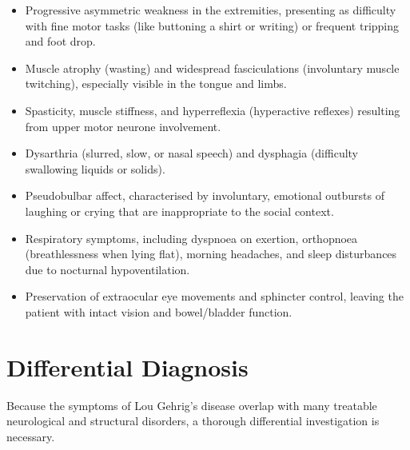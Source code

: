 \begin{itemize}
    \item Progressive asymmetric weakness in the extremities, presenting as difficulty with fine motor tasks (like buttoning a shirt or writing) or frequent tripping and foot drop.
    \item Muscle atrophy (wasting) and widespread fasciculations (involuntary muscle twitching), especially visible in the tongue and limbs.
    \item Spasticity, muscle stiffness, and hyperreflexia (hyperactive reflexes) resulting from upper motor neurone involvement.
    \item Dysarthria (slurred, slow, or nasal speech) and dysphagia (difficulty swallowing liquids or solids).
    \item Pseudobulbar affect, characterised by involuntary, emotional outbursts of laughing or crying that are inappropriate to the social context.
    \item Respiratory symptoms, including dyspnoea on exertion, orthopnoea (breathlessness when lying flat), morning headaches, and sleep disturbances due to nocturnal hypoventilation.
    \item Preservation of extraocular eye movements and sphincter control, leaving the patient with intact vision and bowel/bladder function.
\end{itemize}

\section*{Differential Diagnosis}
Because the symptoms of Lou Gehrig's disease overlap with many treatable neurological and structural disorders, a thorough differential investigation is necessary.

